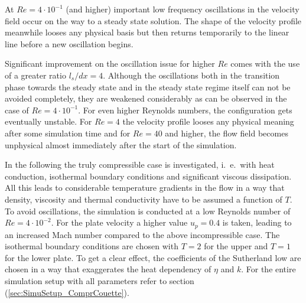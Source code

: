 \documentclass{report}
\begin{document}
At $Re=4\cdot10^{-1}$ (and higher) important low frequency oscillations in the velocity field occur on the way to a steady state solution. The shape of the velocity profile meanwhile looses any physical basis but then returns temporarily to the linear line before a new oscillation begins.

Significant improvement on the oscillation issue for higher $Re$ comes with the use of a greater ratio $l_s/dx=4$. Although the oscillations both in the transition phase towards the steady state and in the steady state regime itself can not be avoided completely, they are weakened considerably as can be observed in the case of $Re=4\cdot10^{-1}$. 
For even higher Reynolds numbers, the configuration gets eventually unstable. For $Re=4$ the velocity profile looses any physical meaning after some simulation time and for $Re=40$ and higher, the flow field becomes unphysical almost immediately after the start of the simulation.

In the following the truly compressible case is investigated, i.\ e.\ with heat conduction, isothermal boundary conditions and significant viscous dissipation. All this leads to considerable temperature gradients in the flow in a way that density, viscosity and thermal conductivity have to be assumed a function of $T$. To avoid oscillations, the simulation is conducted at a low Reynolds number of $Re=4\cdot10^{-2}$. For the plate velocity a higher value $u_p=0.4$ is taken, leading to an increased Mach number compared to the above incompressible case. The isothermal boundary conditions are chosen with $T=2$ for the upper and $T=1$ for the lower plate. To get a clear effect, the coefficients of the Sutherland low are chosen in a way that exaggerates the heat dependency of $\eta$ and $k$. For the entire simulation setup with all parameters refer to section (\ref{sec:SimuSetup_ComprCouette}). %
\end{document}
